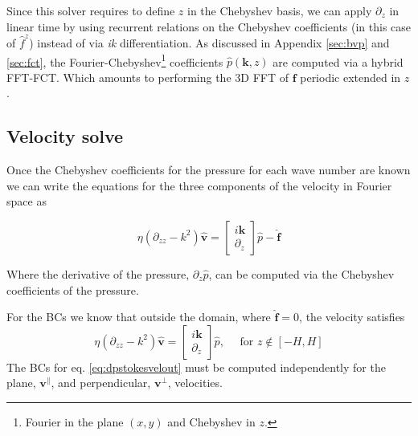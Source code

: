 \documentclass[ twoside,openright,titlepage,numbers=noenddot,%
headinclude,footinclude,cleardoublepage=empty,abstract=on,
BCOR=5mm,paper=a4,fontsize=11pt, dvipsnames
]{scrreprt}
\renewcommand{\vec}[1]{\bm{#1}}
\newcommand{\fou}[1]{\widehat{#1}}
\newcommand{\fvel}{v}
\begin{document}
Since this solver requires to define $z$ in the Chebyshev basis, we can apply $\partial_z$ in linear time by using recurrent relations on the Chebyshev coefficients (in this case of $\fou{f}^z$) instead of via \emph{ik} differentiation. As discussed in Appendix \ref{sec:bvp} and \ref{sec:fct}, the Fourier-Chebyshev\footnote{Fourier in the plane $(x,y)$ and Chebyshev in $z$.} coefficients $\fou{p}(\vec{k}, z)$ are computed via a hybrid \gls{FFT}-\gls{FCT}. Which amounts to performing the 3D \gls{FFT} of $\vec{f}$ periodic extended in $z$.

\subsection*{Velocity solve}
Once the Chebyshev coefficients for the pressure for each wave number are known we can write the equations for the three components of the velocity in Fourier space as

\begin{equation}
  \label{eq:dpstokesvel}
  \eta\left(\partial_{zz} -k^2\right)\fou{\vec{\fvel}} = 
  \begin{bmatrix}
    i\vec{k}\\
    \partial_z
  \end{bmatrix}
  \fou{p} -\fou{\vec{f}}
\end{equation}

Where the derivative of the pressure, $\partial_z\fou{p}$, can be computed via the Chebyshev coefficients of the pressure.

For the \glspl{BC} we know that outside the domain, where $\fou{\vec{f}} = 0$, the velocity satisfies
\begin{equation}
  \label{eq:dpstokesvelout}
  \eta\left(\partial_{zz} -k^2\right)\fou{\vec{\fvel}} = 
  \begin{bmatrix}
    i\vec{k}\\
    \partial_z
  \end{bmatrix}
  \fou{p}, \quad \text{ for } z \notin [-H,H]
\end{equation}
The \glspl{BC} for eq. \eqref{eq:dpstokesvelout} must be computed independently for the plane, $\vec{\fvel}^\parallel$, and perpendicular, $\vec{\fvel}^\perp$, velocities.
\end{document}
